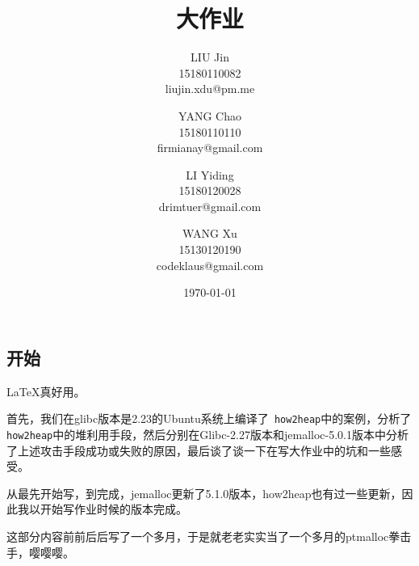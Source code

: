 \documentclass{article}
\title{\Huge{\classname{} 大作业}}
\author{LIU Jin\\
15180110082 \\
\small{liujin.xdu@pm.me} \and
YANG Chao\\
15180110110 \\
\small{firmianay@gmail.com} \and
LI Yiding\\
15180120028 \\
\small{drimtuer@gmail.com} \and
WANG Xu\\
15130120190 \\
\small{codeklaus@gmail.com}
}
\date{\today}
\begin{document}
\maketitle

\renewcommand{\contentsname}{目录}

\newpage
\tableofcontents
\newpage

\begin{center}
    \section{开始}
\end{center}

\setlength{\parindent}{2em}

 \LaTeX 真好用。
 
 首先，我们在glibc版本是2.23的Ubuntu系统上编译了\verb+ how2heap+中的案例，分析了\verb+ how2heap+中的堆利用手段，然后分别在Glibc-2.27版本和jemalloc-5.0.1版本中分析了上述攻击手段成功或失败的原因，最后谈了谈一下在写大作业中的坑和一些感受。
 
从最先开始写，到完成，jemalloc更新了5.1.0版本，how2heap也有过一些更新，因此我以开始写作业时候的版本完成。
 
这部分内容前前后后写了一个多月，于是就老老实实当了一个多月的ptmalloc拳击手，嘤嘤嘤。

\newpage









\end{document}
